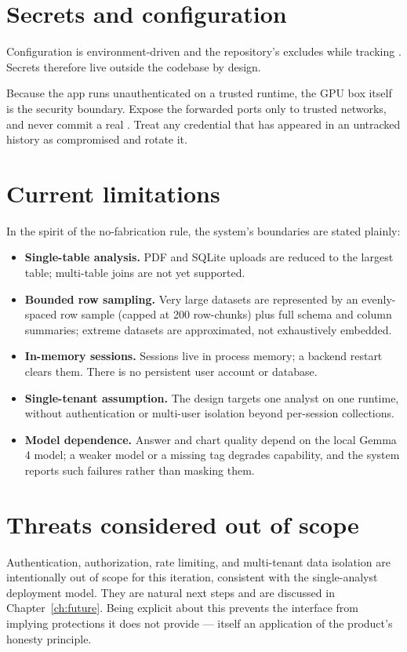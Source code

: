 \section{Secrets and configuration}
Configuration is environment-driven and the repository's 
excludes  while tracking . Secrets therefore live
outside the codebase by design.

\begin{uawarn}
Because the app runs unauthenticated on a trusted runtime, the GPU box itself is
the security boundary. Expose the forwarded ports only to trusted networks, and
never commit a real . Treat any credential that has appeared in an
untracked history as compromised and rotate it.
\end{uawarn}

\section{Current limitations}
In the spirit of the no-fabrication rule, the system's boundaries are stated
plainly:

\begin{itemize}
  \item \textbf{Single-table analysis.} PDF and SQLite uploads are reduced to the
        largest table; multi-table joins are not yet supported.
  \item \textbf{Bounded row sampling.} Very large datasets are represented by an
        evenly-spaced row sample (capped at 200 row-chunks) plus full schema and
        column summaries; extreme datasets are approximated, not exhaustively
        embedded.
  \item \textbf{In-memory sessions.} Sessions live in process memory; a backend
        restart clears them. There is no persistent user account or database.
  \item \textbf{Single-tenant assumption.} The design targets one analyst on one
        runtime, without authentication or multi-user isolation beyond
        per-session collections.
  \item \textbf{Model dependence.} Answer and chart quality depend on the local
        Gemma\,4 model; a weaker model or a missing tag degrades capability, and
        the system reports such failures rather than masking them.
\end{itemize}

\section{Threats considered out of scope}
Authentication, authorization, rate limiting, and multi-tenant data isolation are
intentionally out of scope for this iteration, consistent with the single-analyst
deployment model. They are natural next steps and are discussed in
Chapter~\ref{ch:future}. Being explicit about this prevents the interface from
implying protections it does not provide --- itself an application of the
product's honesty principle.
